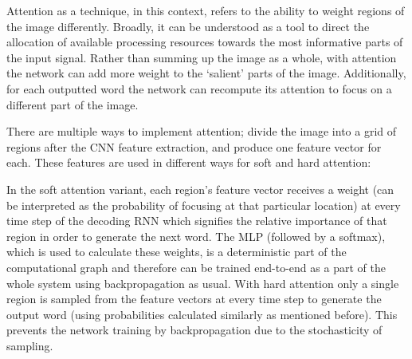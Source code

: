Attention as a technique, in this context, refers to the ability to weight regions of the image differently. Broadly, it can be understood as a tool to direct the allocation of available processing resources towards the most informative parts of the input signal. Rather than summing up the image as a whole, with attention the network can add more weight to the ‘salient’ parts of the image. Additionally, for each outputted word the network can recompute its attention to focus on a different part of the image.

There are multiple ways to implement attention; \citet{Xu2015} divide the image into a grid of regions after the CNN feature extraction, and produce one feature vector for each. These features are used in different ways for soft and hard attention:

In the soft attention variant, each region’s feature vector receives a weight (can be interpreted as the probability of focusing at that particular location) at every time step of the decoding RNN which signifies the relative importance of that region in order to generate the next word. The MLP (followed by a softmax), which is used to calculate these weights, is a deterministic part of the computational graph and therefore can be trained end-to-end as a part of the whole system using backpropagation as usual.
With hard attention only a single region is sampled from the feature vectors at every time step to generate the output word (using probabilities calculated similarly as mentioned before). This prevents the network training by backpropagation due to the stochasticity of sampling.





